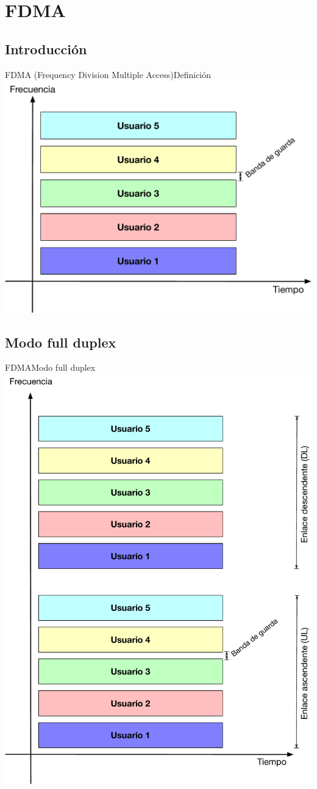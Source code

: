 \documentclass[10pt,compress]{beamer} %
\begin{document}
\section{FDMA}

\subsection{Introducción}
\begin{frame}{FDMA (Frequency Division Multiple Access)}{Definición}
	\centering \includegraphics[width=0.8\linewidth]{Figuras/FDMA.pdf}
\end{frame}

\subsection{Modo full duplex}
\begin{frame}{FDMA}{Modo full duplex}
  \centering \includegraphics[width=0.4\linewidth]{Figuras/FDMA_FD.pdf}
\end{frame}
\end{document}
